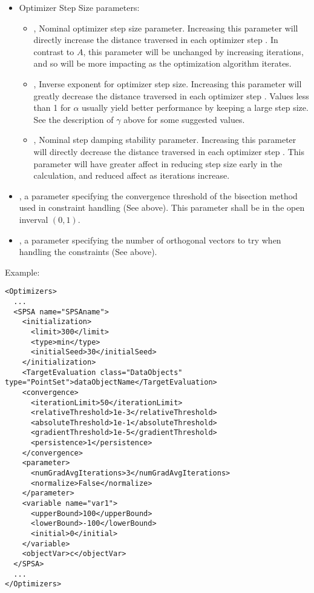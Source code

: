 \begin{itemize}
\begin{itemize}
  \item Optimizer Step Size parameters:
    \begin{itemize}
      \item {},  Nominal optimizer step size parameter.  Increasing
        this parameter will directly increase the distance traversed in each optimizer step
        \cite{spall1998implementation}. In contrast to $A$, this parameter will be unchanged by increasing
        iterations, and so will be more impacting as the optimization algorithm iterates. 
      \item {},  Inverse exponent for optimizer step size.
        Increasing this parameter will greatly decrease the distance traversed in each optimizer step
        \cite{spall1998implementation}. Values less than 1 for $\alpha$ usually yield better performance by
        keeping a large step size. See the description of $\gamma$ above for some suggested values. 
      \item {},  Nominal step damping stability parameter.  Increasing this
        parameter will directly decrease the distance traversed in each optimizer step
        \cite{spall1998implementation}. This parameter will have greater affect in reducing step size early in
        the calculation, and reduced affect as iterations increase. 
    \end{itemize}
  \item {},  a parameter specifying the convergence threshold of the
  bisection method used in constraint handling (See above). This parameter shall be in the open inverval $(0,1)$.
  \item {},  a parameter specifying the number of orthogonal vectors to try
  when handling the constraints (See above).
  \end{itemize}
\end{itemize}


Example:
\begin{lstlisting}[style=XML]
<Optimizers>
  ...
  <SPSA name="SPSAname">
    <initialization>
      <limit>300</limit>
      <type>min</type>
      <initialSeed>30</initialSeed>
    </initialization>
    <TargetEvaluation class="DataObjects" type="PointSet">dataObjectName</TargetEvaluation>
    <convergence>
      <iterationLimit>50</iterationLimit>
      <relativeThreshold>1e-3</relativeThreshold>
      <absoluteThreshold>1e-1</absoluteThreshold>
      <gradientThreshold>1e-5</gradientThreshold>
      <persistence>1</persistence>
    </convergence>
    <parameter>
      <numGradAvgIterations>3</numGradAvgIterations>
      <normalize>False</normalize>
    </parameter>
    <variable name="var1">
      <upperBound>100</upperBound>
      <lowerBound>-100</lowerBound>
      <initial>0</initial>
    </variable>
    <objectVar>c</objectVar>
  </SPSA>
  ...
</Optimizers>
\end{lstlisting}
